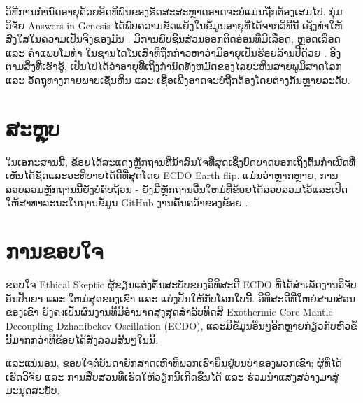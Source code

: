 \documentclass[10pt,twocolumn,letterpaper]{article}
\begin{document}
ວິທີການກຳນົດອາຍຸດ້ວຍອິດທິພົນຂອງຮັດສະສະຫຼາດອາດຈະບໍ່ແມ່ນຖືກຕ້ອງເສມໄປ. ກຸ່ມວິຈັຍ Answers in Genesis ໄດ້ພົບຄວາມຂັດແຍ້ງໃນຂໍ້ມູນອາຍຸທີ່ໄດ້ຈາກວິທີນີ້ ເຊິ່ງທໍາໃຫ້ສົງໃສໃນຄວາມເປັນຈິງຂອງມັນ \cite{108}. ມີການພົບຊິ້ນສ່ວນອອກຕິດອ່ອນທີ່ມີເລືອດ, ຫຼອດເລືອດ ແລະ ຄໍາແພບໂມທໍາ ໃນຊານໄດໂນເສົາທີ່ຖືກກ່າວຫາວ່າມີອາຍຸເປັນຮ້ອຍລ້ານປີດ້ວຍ \cite{109,110}. ອີງຕາມສິ່ງທີ່ເຮົາຮູ້, ເປັນໄປໄດ້ວ່າອາຍຸທີ່ເຖິງກຳນົດທັງຫມົດຂອງໄລຍະຫິນສາຍພູມິສາດໂລກ ແລະ ວັດຖຸທາງກາຍພາບເຊັ່ນຫິນ ແລະ ເຊື້ອເພີງອາດຈະບໍ່ຖືກຕ້ອງໂດຍຕ່າງກັນຫຼາຍລະດັບ.

\section{ສະຫຼຸບ}

ໃນເອກະສານນີ້, ຂ້ອຍໄດ້ສະແດງຫຼັກຖານທີ່ນ້າສົນໃຈທີ່ສຸດເຊິ່ງບົດບາດບອກເຖິງຕົ້ນກຳເນີດທີ່ເຫັນໄດ້ຊັດແລະອະທິບາຍໄດ້ດີທີ່ສຸດໂດຍ ECDO Earth flip. ແມ່ນວ່າຫຼາກຫຼາຍ, ການລວບລວມຫຼັກຖານນີ້ຍັງບໍ່ຄົບຖ້ວນ - ຍັງມີຫຼັກຖານອື່ນໃຫມ່ທີ່ຂ້ອຍໄດ້ລວບລວມໄວ້ແລະເປີດໃຫ້ສາທາລະນະໃນຖານຂໍ້ມູນ GitHub ງານຄົ້ນຄວ້າຂອງຂ້ອຍ \cite{2}.
\section{ການຂອບໃຈ}

ຂອບໃຈ Ethical Skeptic ຜູ້ຂຽນແຕ່ງຕົ້ນສະບັບຂອງວິທິສະດີ ECDO ທີ່ໄດ້ສຳເລັດງານວິຈັບອັນປັນຍາ ແລະ ໃຫມ່ສຸດຂອງເຂົາ ແລະ ແບ່ງປັນໃຫ້ກັບໂລກໃບນີ້. ວິທິສະດີທີ່ໃຫຍ່ສາມສ່ວນຂອງເຂົາ \cite{1} ຍັງຄงເປັນຜົນງານທີ່ມີອຳນາດສູງສຸດສຳລັບທິດສີ Exothermic Core-Mantle Decoupling Dzhanibekov Oscillation (ECDO), ແລະມີຂໍ້ມູນອື່ນໆອີກຫຼາຍກ່ຽວກັບຫົວຂໍ້ນີ້ມາກກວ່າທີ່ຂ້ອຍໄດ້ສັງລວມສັ້ນໆໃນນີ້.

ແລະແນ່ນອນ, ຂອບໃຈຕໍ່ບັນດາຍັກສາດເຫົາທີ່ພວກເຮົາຍືນຢູ່ບນບ່າຂອງພວກເຂົາ; ຜູ້ທີ່ໄດ້ເຮັດວິຈັຍ ແລະ ການສືບສວນທີ່ເຮັດໃຫ້ວຽກນີ້ເກີດຂຶ້ນໄດ້ ແລະ ຮ່ວມນຳແສງສວ່າງມາສູ່ມະນຸດສະບັບ.

\clearpage
\twocolumn

{\small
\renewcommand{\refname}{ບັນຊີອ້າງອີງ}


}
\end{document}

